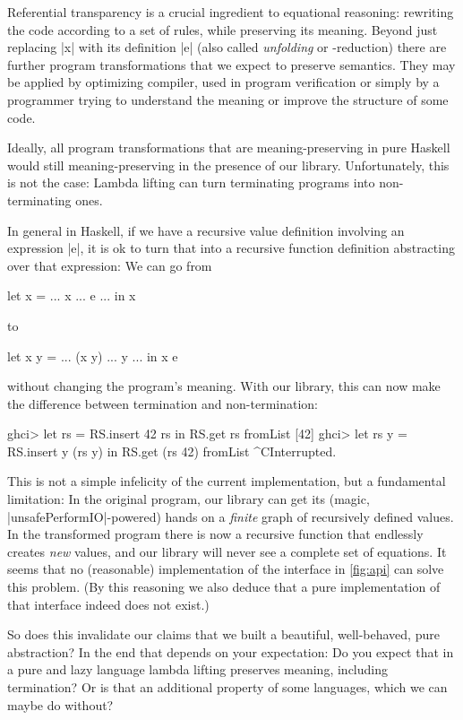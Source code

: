 \documentclass[manuscript,screen,acmsmall,nonacm]{acmart}
\begin{document}
Referential transparency is a crucial ingredient to equational reasoning: rewriting the code according to a set of rules, while preserving its meaning. Beyond just replacing |x| with its definition |e| (also called \emph{unfolding} or \textdelta-reduction) there are further program transformations that we expect to preserve semantics. They may be applied by optimizing compiler, used in program verification or simply by a programmer trying to understand the meaning or improve the structure of some code.

Ideally, all program transformations that are meaning-preserving in pure Haskell would still meaning-preserving in the presence of our library. Unfortunately, this is not the case: Lambda lifting can turn terminating programs into non-terminating ones.

In general in Haskell, if we have a recursive value definition involving an expression |e|, it is ok to turn that into a recursive function definition abstracting over that expression: We can go from
\begin{code}
let x = ... x ... e ... in x
\end{code}
to
\begin{code}
let x y = ... (x y) ... y ... in x e
\end{code}
without changing the program's meaning. With our library, this can now make the difference between termination and non-termination:
\begin{code}
ghci> let rs = RS.insert 42 rs in RS.get rs
fromList [42]
ghci> let rs y = RS.insert y (rs y) in RS.get (rs 42)
fromList ^CInterrupted.
\end{code}

This is not a simple infelicity of the current implementation, but a fundamental limitation: In the original program, our library can get its (magic, |unsafePerformIO|-powered) hands on a \emph{finite} graph of recursively defined values. In the transformed program there is now a recursive function that endlessly creates \emph{new} values, and our library will never see a complete set of equations. It seems that no (reasonable) implementation of the interface in \cref{fig:api} can solve this problem. (By this reasoning we also deduce that a pure implementation of that interface indeed does not exist.)

So does this invalidate our claims that we built a beautiful, well-behaved, pure abstraction? In the end that depends on your expectation: Do you expect that in a pure and lazy language lambda lifting preserves meaning, including termination? Or is that an additional property of some languages, which we can maybe do without?
\end{document}
